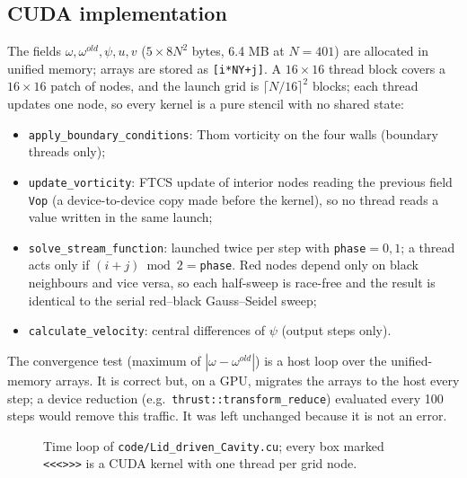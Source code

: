 \subsection{CUDA implementation}
The fields $\omega,\omega^{old},\psi,u,v$ ($5\times8N^2$ bytes, 6.4 MB at $N=401$) are allocated in unified memory; arrays are stored as \texttt{[i*NY+j]}. A $16\times16$ thread block covers a $16\times16$ patch of nodes, and the launch grid is $\lceil N/16\rceil^2$ blocks; each thread updates one node, so every kernel is a pure stencil with no shared state:
\begin{itemize}
\item \texttt{apply\_boundary\_conditions}: Thom vorticity on the four walls (boundary threads only);
\item \texttt{update\_vorticity}: FTCS update of interior nodes reading the previous field \texttt{Vop} (a device-to-device copy made before the kernel), so no thread reads a value written in the same launch;
\item \texttt{solve\_stream\_function}: launched twice per step with \texttt{phase}$=0,1$; a thread acts only if $(i+j)\bmod2=$\texttt{phase}. Red nodes depend only on black neighbours and vice versa, so each half-sweep is race-free and the result is identical to the serial red--black Gauss--Seidel sweep;
\item \texttt{calculate\_velocity}: central differences of $\psi$ (output steps only).
\end{itemize}
The convergence test (maximum of $|\omega-\omega^{old}|$) is a host loop over the unified-memory arrays. It is correct but, on a GPU, migrates the arrays to the host every step; a device reduction (e.g.\ \texttt{thrust::transform\_reduce}) evaluated every 100 steps would remove this traffic. It was left unchanged because it is not an error.

\begin{figure}[H]\centering
{}\caption{Time loop of \texttt{code/Lid\_driven\_Cavity.cu}; every box marked \texttt{<<<>>>} is a CUDA kernel with one thread per grid node.}\end{figure}

